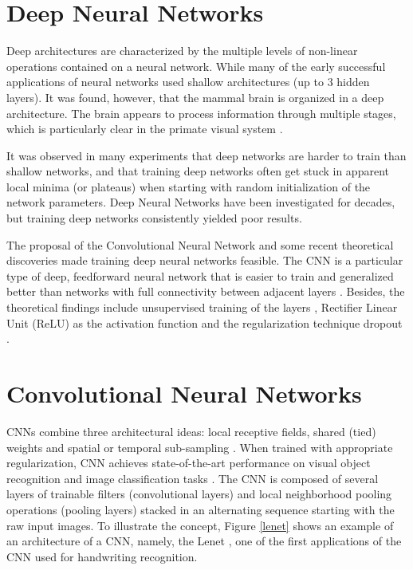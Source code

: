 
\section{Deep Neural Networks}
Deep architectures are characterized by the multiple levels of non-linear operations
contained on a neural network. While many of the early successful applications of neural networks used shallow architectures (up to 3 hidden layers). It was found, however, that the mammal brain is organized in a deep architecture. The brain appears to process information through multiple stages, which is particularly clear in the primate visual system \cite{bengio2009learning}. 

It was observed in many experiments that deep networks are harder to train than shallow networks, and that training deep networks often get stuck in apparent local minima (or plateaus) when starting with random initialization of the network parameters. Deep Neural Networks have been investigated for decades, but training deep networks consistently yielded poor results. 

The proposal of the Convolutional Neural Network \cite{lecun1995convolutional} and some recent theoretical discoveries made training deep neural networks feasible. The CNN is a particular type of deep, feedforward neural network that is easier to train and generalized better than networks with full connectivity between adjacent layers \cite{lecun2015deep}. Besides, the theoretical findings include unsupervised training of the layers \cite{hinton2006fast}, Rectifier Linear Unit (ReLU) \cite{nair2010rectified} as the activation function and the regularization technique dropout \cite{srivastava2014dropout}. 


\section{Convolutional Neural Networks}
CNNs combine three architectural ideas: local receptive fields, shared
(tied) weights and spatial or temporal sub-sampling \cite{lecun1998gradient}. When trained with appropriate regularization, CNN achieves state-of-the-art performance
on visual object recognition and image classification tasks \cite{lecun2015deep}. The CNN is composed of several layers of trainable filters (convolutional layers) and local neighborhood pooling operations (pooling layers) stacked in an alternating sequence starting with the raw input images. To illustrate the concept, Figure \ref{lenet} shows an example of an architecture of a CNN, namely, the Lenet \cite{lecun1998gradient}, one of the first applications of the CNN used for handwriting recognition.

